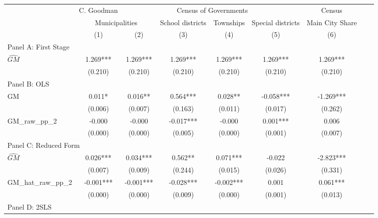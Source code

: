  \begin{tabular}{l*{8}{c}} \toprule
&\multicolumn{1}{c}{C. Goodman}&\multicolumn{4}{c}{Census of Governments}&\multicolumn{1}{c}{Census}\\\cmidrule(lr){2-2}\cmidrule(lr){3-6}\cmidrule(lr){7-7}
&\multicolumn{2}{c}{Municipalities}&\multicolumn{1}{c}{School districts}&\multicolumn{1}{c}{Townships}&\multicolumn{1}{c}{Special districts}&\multicolumn{1}{c}{Main City Share}\\\cmidrule(lr){2-3}\cmidrule(lr){4-6}\cmidrule(lr){7-7}
&\multicolumn{1}{c}{(1)}&\multicolumn{1}{c}{(2)}&\multicolumn{1}{c}{(3)}&\multicolumn{1}{c}{(4)}&\multicolumn{1}{c}{(5)}&\multicolumn{1}{c}{(6)}\\
\cmidrule(lr){1-7}
\multicolumn{6}{l}{Panel A: First Stage}\\
\cmidrule(lr){1-7}
$\widehat{GM}$  &    1.269***&    1.269***&    1.269***&    1.269***&    1.269***&    1.269***\\
                &  (0.210)   &  (0.210)   &  (0.210)   &  (0.210)   &  (0.210)   &  (0.210)   \\
\cmidrule(lr){1-7}
\multicolumn{6}{l}{Panel B: OLS}\\
\cmidrule(lr){1-7}
GM              &    0.011*  &    0.016** &    0.564***&    0.028** &   -0.058***&   -1.269***\\
                &  (0.006)   &  (0.007)   &  (0.163)   &  (0.011)   &  (0.017)   &  (0.262)   \\
\addlinespace
GM\_raw\_pp\_2     &   -0.000   &   -0.000   &   -0.017***&   -0.000   &    0.001***&    0.006   \\
                &  (0.000)   &  (0.000)   &  (0.005)   &  (0.000)   &  (0.001)   &  (0.007)   \\
\cmidrule(lr){1-7}
\multicolumn{6}{l}{Panel C: Reduced Form}\\
\cmidrule(lr){1-7}
$\widehat{GM}$  &    0.026***&    0.034***&    0.562** &    0.071***&   -0.022   &   -2.823***\\
                &  (0.007)   &  (0.009)   &  (0.244)   &  (0.015)   &  (0.026)   &  (0.331)   \\
\addlinespace
GM\_hat\_raw\_pp\_2 &   -0.001***&   -0.001***&   -0.028***&   -0.002***&    0.001   &    0.061***\\
                &  (0.000)   &  (0.000)   &  (0.009)   &  (0.000)   &  (0.001)   &  (0.013)   \\
\cmidrule(lr){1-7}
\multicolumn{6}{l}{Panel D: 2SLS}\\
\cmidrule(lr){1-7}

\end{tabular}
